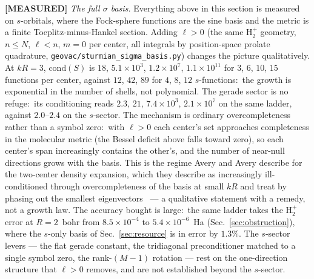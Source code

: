 \documentclass[aps,pra,twocolumn,superscriptaddress,longbibliography]{revtex4-2}
\begin{document}
\textbf{[MEASURED]} \emph{The full $\sigma$ basis.}  Everything above in this
section is measured on $s$-orbitals, where the Fock-sphere functions are the
sine basis and the metric is a finite Toeplitz-minus-Hankel section.  Adding
$\ell>0$ (the same $\mathrm{H}_2^+$ geometry, $n\le N$, $\ell<n$, $m=0$ per
center, all integrals by position-space prolate quadrature,
\texttt{geovac/sturmian\_sigma\_basis.py}) changes the picture
qualitatively.  At $kR=3$, $\mathrm{cond}(S)$ is $18$, $5.1\times10^{3}$,
$1.2\times10^{7}$, $1.1\times10^{11}$ for $3$, $6$, $10$, $15$ functions per
center, against $12$, $42$, $89$ for $4$, $8$, $12$ $s$-functions:\ the growth
is exponential in the number of shells, not polynomial.  The gerade sector is
no refuge:\ its conditioning reads $2.3$, $21$, $7.4\times10^{3}$,
$2.1\times10^{7}$ on the same ladder, against $2.0$--$2.4$ on the $s$-sector.
The mechanism is ordinary overcompleteness rather than a symbol zero:\ with
$\ell>0$ each center's set approaches completeness in the molecular metric
(the Bessel deficit above falls toward zero), so each center's span increasingly
contains the other's, and the number of near-null directions grows with the
basis.  This is the regime Avery and Avery describe for the two-center density
expansion, which they describe as increasingly ill-conditioned through
overcompleteness of the basis at small $kR$ and treat by phasing out the
smallest eigenvectors~\cite{avery2013,avery2017} --- a qualitative
statement with a remedy, not a growth law.  The accuracy bought is large:\ the
same ladder takes the $\mathrm{H}_2^+$ error at $R=2$~bohr from
$8.5\times10^{-4}$ to $5.4\times10^{-6}$~Ha (Sec.~\ref{sec:obstruction}), where
the $s$-only basis of Sec.~\ref{sec:resource} is in error by $1.3\%$.  The
$s$-sector levers --- the flat gerade constant, the tridiagonal preconditioner
matched to a single symbol zero, the rank-$(M-1)$ rotation --- rest on the
one-direction structure that $\ell>0$ removes, and are not established beyond
the $s$-sector.
\end{document}
